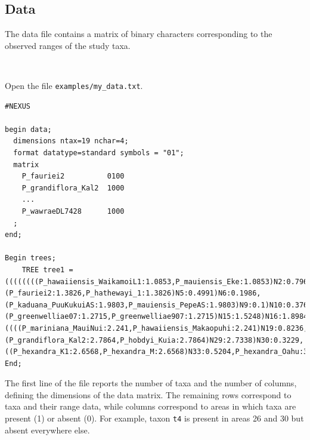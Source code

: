 \documentclass[11pt]{article}
\newcommand{\impmark}{\strut\vadjust{\domark}}
\newcommand{\domark}{%
  \vbox to 0pt{
    \kern-\dp\strutbox
    \smash{\llap{$\rightarrow$\kern1em}}
    \vss
  }%
}
\begin{document}
\subsection{Data}

The data file contains a matrix of binary characters corresponding to the observed ranges of the study taxa.

\noindent \\ \impmark  Open the file \texttt{examples/my\_data.txt}.

\begin{framed} \begin{lstlisting}
#NEXUS

begin data;
  dimensions ntax=19 nchar=4;
  format datatype=standard symbols = "01";
  matrix
    P_fauriei2          0100
    P_grandiflora_Kal2  1000
    ...
    P_wawraeDL7428      1000	
  ;
end;

Begin trees;
	TREE tree1 = ((((((((P_hawaiiensis_WaikamoiL1:1.0853,P_mauiensis_Eke:1.0853)N2:0.7964,(P_fauriei2:1.3826,P_hathewayi_1:1.3826)N5:0.4991)N6:0.1986,(P_kaduana_PuuKukuiAS:1.9803,P_mauiensis_PepeAS:1.9803)N9:0.1)N10:0.3762,P_kaduana_HawaiiLoa:2.4565)N12:0.3398,(P_greenwelliae07:1.2715,P_greenwelliae907:1.2715)N15:1.5248)N16:1.8984,((((P_mariniana_MauiNui:2.241,P_hawaiiensis_Makaopuhi:2.241)N19:0.8236,P_mariniana_Oahu:3.0646)N21:0.2893,P_mariniana_Kokee2:3.3539)N23:0.5171,P_wawraeDL7428:3.871)N25:0.8237)N26:0.8255,(P_grandiflora_Kal2:2.7864,P_hobdyi_Kuia:2.7864)N29:2.7338)N30:0.3229,((P_hexandra_K1:2.6568,P_hexandra_M:2.6568)N33:0.5204,P_hexandra_Oahu:3.1772)N35:2.6659)N36;
End;
\end{lstlisting}
\end{framed}

The first line of the file reports the number of taxa and the number of columns, defining the dimensions of the data matrix.
The remaining rows correspond to taxa and their range data, while columns correspond to areas in which taxa are present (1) or absent (0).
For example, taxon \texttt{t4} is present in areas 26 and 30 but absent everywhere else.
 
\end{document}
